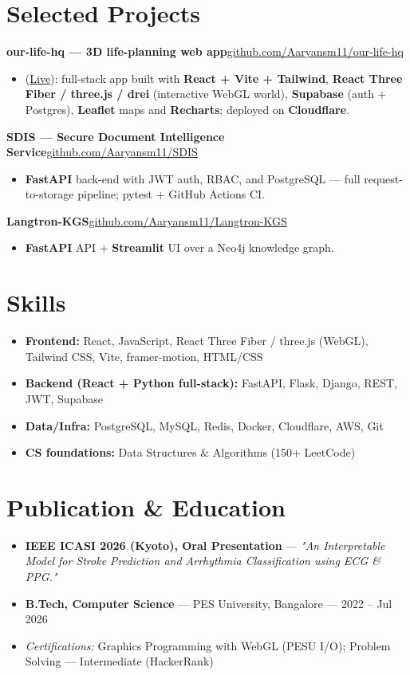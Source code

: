 \documentclass[10pt,a4paper]{article}
\begin{document}
\section*{Selected Projects}
\vspace{1pt}\textbf{our-life-hq --- 3D life-planning web app}\hfill {\small\href{https://github.com/Aaryansm11/our-life-hq}{github.com/Aaryansm11/our-life-hq}}
\begin{itemize}
\item (\href{https://our-life-hq.aaryansmaralihalli.workers.dev/}{Live}): full-stack app built with \textbf{React + Vite + Tailwind}, \textbf{React Three Fiber / three.js / drei} (interactive WebGL world), \textbf{Supabase} (auth + Postgres), \textbf{Leaflet} maps and \textbf{Recharts}; deployed on \textbf{Cloudflare}.
\end{itemize}
\vspace{1pt}\textbf{SDIS --- Secure Document Intelligence Service}\hfill {\small\href{https://github.com/Aaryansm11/SDIS}{github.com/Aaryansm11/SDIS}}
\begin{itemize}
\item \textbf{FastAPI} back-end with JWT auth, RBAC, and PostgreSQL --- full request-to-storage pipeline; pytest + GitHub Actions CI.
\end{itemize}
\vspace{1pt}\textbf{Langtron-KGS}\hfill {\small\href{https://github.com/Aaryansm11/Langtron-KGS}{github.com/Aaryansm11/Langtron-KGS}}
\begin{itemize}
\item \textbf{FastAPI} API + \textbf{Streamlit} UI over a Neo4j knowledge graph.
\end{itemize}
\section*{Skills}
\begin{itemize}
\item \textbf{Frontend:} React, JavaScript, React Three Fiber / three.js (WebGL), Tailwind CSS, Vite, framer-motion, HTML/CSS
\item \textbf{Backend (React + Python full-stack):} FastAPI, Flask, Django, REST, JWT, Supabase
\item \textbf{Data/Infra:} PostgreSQL, MySQL, Redis, Docker, Cloudflare, AWS, Git
\item \textbf{CS foundations:} Data Structures \& Algorithms (150+ LeetCode)
\end{itemize}
\section*{Publication \& Education}
\begin{itemize}
\item \textbf{IEEE ICASI 2026 (Kyoto), Oral Presentation} --- \textit{"An Interpretable Model for Stroke Prediction and Arrhythmia Classification using ECG \& PPG."}
\item \textbf{B.Tech, Computer Science} --- PES University, Bangalore --- 2022 -- Jul 2026
\item \textit{Certifications:} Graphics Programming with WebGL (PESU I/O); Problem Solving --- Intermediate (HackerRank)
\end{itemize}
\end{document}
